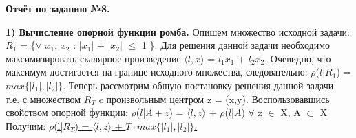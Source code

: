 \documentclass[14pt,a4paper]{article}
\begin{document}
	{\vspace*{-3cm}\huge \bfseries Отчёт по заданию №8.}
	\newline
	\begin{flushleft}
		{\hspace{-2cm}\bf \Large 1) Вычисление опорной функции ромба.}
		\newline
		\newline
		{\hspace*{-2cm} \large Опишем множество исходной задачи:}		
		\newline
		\newline
		{\hspace*{-1cm}\large $R_1$ = \{$\forall$ $x_1$, $x_2$ : |$x_1$| + |$x_2$| $\leq$ 1   \}.}
		\newline
		\newline
		{\hspace*{-2cm} \large Для решения данной задачи необходимо максимизировать скалярное 
		\newline \hspace*{-2cm}  произведение $\langle l, x \rangle$ = $l_1$$x_1$ + $l_2$$x_2$.}
		\newline
		\newline
		{\hspace*{-2cm} \large Очевидно, что максимум достигается на границе исходного множества,
		\newline \hspace*{-2cm} следовательно:}
		\newline 
		\newline
		{\hspace*{-1cm}\Large $\rho$($l$|$R_1$) = $max\{|l_1|,|l_2|\}$. }
		\newline
		\newline
		{\hspace*{-2cm} \large Теперь рассмотрим общую постановку решения данной задачи, т.е. 
		\newline \hspace*{-2cm} с множеством $R_T$ c произвольным центром z = (x,y). Воспользовавшись \newline \hspace*{-2cm} свойством опорной функции:}
		\newline
		\newline
		{\hspace*{-1cm}\Large  $\rho$($l$|$A + z$) = $\langle l, z \rangle$ + $\rho$($l$|$A$) \quad $\forall$ z $\in$ X, A $\subset$ X  }
		\newline
		\newline
		{\hspace*{-2cm} \large Получим:}
		\newline
		\newline
		{\hspace*{-1cm}\Large \underline {$\rho$(l|$R_T$) = $\langle l, z \rangle$ + $T \cdot max\{|l_1|,|l_2|\}$. }}
		
	\end{flushleft}
\end{document}
